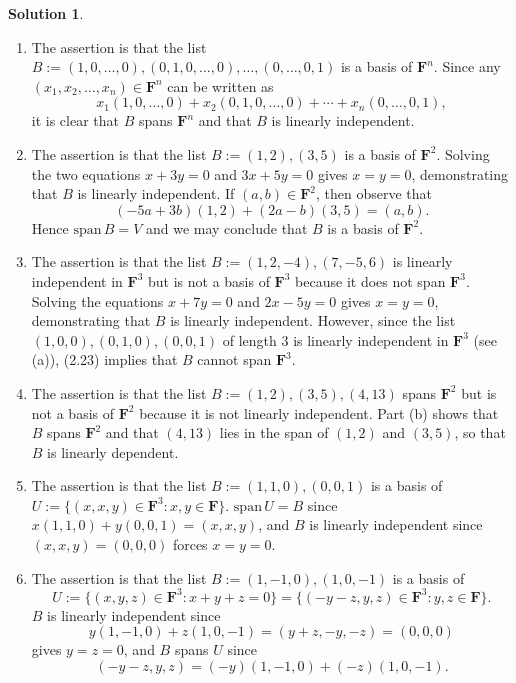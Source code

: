 \documentclass[12pt]{article}
\theoremstyle{definition}
\theoremstyle{exercise}
\theoremstyle{solution}
\newtheorem*{solution}{Solution}
\newcommand{\Span}{\text{span}}
\newcommand{\F}{\mathbf{F}}
\begin{document}
\begin{solution}
    \begin{enumerate}
        \item The assertion is that the list \( B := (1, 0, \ldots, 0), (0, 1, 0, \ldots, 0), \ldots, (0, \ldots, 0, 1) \) is a basis of \( \F^n \). Since any \( (x_1, x_2, \ldots, x_n) \in \F^n \) can be written as
        \[
            x_1 (1, 0, \ldots, 0) + x_2 (0, 1, 0, \ldots, 0) + \cdots + x_n (0, \ldots, 0, 1),
        \]
        it is clear that \( B \) spans \( \F^n \) and that \( B \) is linearly independent.

        \item The assertion is that the list \( B:= (1, 2), (3, 5) \) is a basis of \( \F^2 \). Solving the two equations \( x + 3y = 0 \) and \( 3x + 5y = 0 \) gives \( x = y = 0 \), demonstrating that \( B \) is linearly independent. If \( (a, b) \in \F^2 \), then observe that
        \[
            (-5a + 3b) (1, 2) + (2a - b) (3, 5) = (a, b).
        \]
        Hence \( \Span\,B = V \) and we may conclude that \( B \) is a basis of \( \F^2 \).

        \item The assertion is that the list \( B := (1, 2, -4), (7, -5, 6) \) is linearly independent in \( \F^3 \) but is not a basis of \( \F^3 \) because it does not span \( \F^3 \). Solving the equations \( x + 7y = 0 \) and \( 2x - 5y = 0 \) gives \( x = y = 0 \), demonstrating that \( B \) is linearly independent. However, since the list \( (1, 0, 0), (0, 1, 0), (0, 0, 1) \) of length 3 is linearly independent in \( \F^3 \) (see (a)), (2.23) implies that \( B \) cannot span \( \F^3 \).

        \item The assertion is that the list \( B := (1, 2), (3, 5), (4, 13) \) spans \( \F^2 \) but is not a basis of \( \F^2 \) because it is not linearly independent. Part (b) shows that \( B \) spans \( \F^2 \) and that \( (4, 13) \) lies in the span of \( (1, 2) \) and \( (3, 5) \), so that \( B \) is linearly dependent.

        \item The assertion is that the list \( B:= (1, 1, 0), (0, 0, 1) \) is a basis of \( U := \{ (x, x, y) \in \F^3 : x, y \in \F \} \). \( \Span\,U = B \) since \( x(1, 1, 0) + y(0, 0, 1) = (x, x, y) \), and \( B \) is linearly independent since \( (x, x, y) = (0, 0, 0) \) forces \( x = y = 0 \).

        \item The assertion is that the list \( B := (1, -1, 0), (1, 0, -1) \) is a basis of
        \[
            U := \{ (x, y, z) \in \F^3 : x + y + z = 0 \} = \{ (-y - z, y, z) \in \F^3 : y, z \in \F \}.
        \]
        \( B \) is linearly independent since
        \[
            y(1, -1, 0) + z(1, 0, -1) = (y + z, -y, -z) = (0, 0, 0)
        \]
        gives \( y = z = 0 \), and \( B \) spans \( U \) since
        \[
            (-y - z, y, z) = (-y)(1, -1, 0) + (-z)(1, 0, -1).
        \]


\end{enumerate}
\end{solution}
\end{document}
